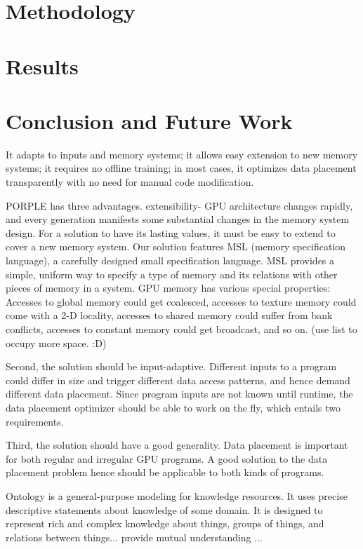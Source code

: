 \documentclass{sig-alternate}
\begin{document}
\section{Methodology}

\section{Results}

\section{Conclusion and Future Work}


It adapts to inputs and memory systems; it allows easy extension to new memory systems; it requires no offline training; in most cases, it optimizes data placement transparently with no need for manual code modification.

PORPLE has three advantages. 
extensibility- GPU architecture changes rapidly, and every generation manifests some substantial changes in the memory system design. For a solution to have its lasting values, it must be easy to extend to cover a new memory system. 
Our solution features MSL (memory specification language), a carefully designed small specification language. MSL provides a simple, uniform way to specify a type of memory and its relations with other pieces of memory in a system. GPU memory has various special properties: Accesses to global memory could get coalesced, accesses to texture memory could come with a 2-D locality, accesses to shared memory could suffer from bank conflicts, accesses to constant memory could get broadcast, and so on. (use list to occupy more space. :D)

Second, the solution should be input-adaptive. Different inputs to a program could differ in size and trigger different data access patterns, and hence demand different data placement. Since program inputs are not known until runtime, the data placement optimizer should be able to work on the fly, which entails two requirements. 

Third, the solution should have a good generality. Data placement is important for both regular and irregular GPU programs. A good solution to the data placement problem hence should be applicable to both kinds of programs.  
 
Ontology \cite{ontology1, ontology2} is a general-purpose modeling for knowledge resources. It uses precise descriptive statements about knowledge of some domain. It is designed to represent rich and complex knowledge about things, groups of things, and relations between things... provide mutual understanding ... 
\end{document}
